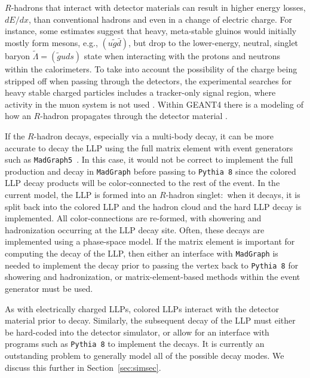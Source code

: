 $R$-hadrons that interact with detector materials can result in higher energy losses, $dE/dx$, than conventional hadrons and even in a change of electric charge.  For instance, some estimates \cite{Buccella:1985cs,Farrar:2010ps} suggest that heavy, meta-stable gluinos would initially mostly form mesons, e.g., $(u \tilde g \bar d)$, but drop to the lower-energy, neutral, singlet baryon $\tilde \Lambda = (\tilde g u d s)$ state when interacting with the protons and neutrons within the calorimeters.  To take into account the possibility of the charge being stripped off when passing through the detectors, the experimental searches for heavy stable charged particles includes a tracker-only signal region, where activity in the muon system is not used \cite{Aaboud:2016uth,CMS:2016ybj}.  Within GEANT4 \cite{Agostinelli:2002hh} there is a modeling of how an $R$-hadron propagates through the detector material \cite{Mackeprang:2009ad}.  

If the $R$-hadron decays, especially via a multi-body decay, it can be more accurate to decay the LLP using the full matrix element with event generators such as \texttt{MadGraph5}~\cite{Alwall:2011uj,Alwall:2014hca}. In this case, it would not be correct to implement the full production and decay in \texttt{MadGraph} before passing to \texttt{Pythia 8} since the colored LLP decay products will be color-connected to the rest of the event. In the current model, the LLP is formed into an $R$-hadron singlet:~when it decays, it is split back into the colored LLP and the hadron cloud and the hard LLP decay is implemented. All color-connections are re-formed, with showering and hadronization occurring at the LLP decay site. Often, these decays are implemented using a phase-space model. If the matrix element is important for computing the decay of the LLP, then either an interface with \texttt{MadGraph} is needed to implement the decay prior to passing the vertex back to \texttt{Pythia 8} for showering and hadronization, or matrix-element-based methods within the event generator must be used.

As with electrically charged LLPs, colored LLPs interact with the detector material prior to decay. Similarly, the subsequent decay of the LLP must either be hard-coded into the detector simulator, or allow for an interface with programs such as \texttt{Pythia 8} to implement the decays. It is currently an outstanding problem to generally model all of the possible decay modes. We discuss this further in Section~\ref{sec:simsec}.

